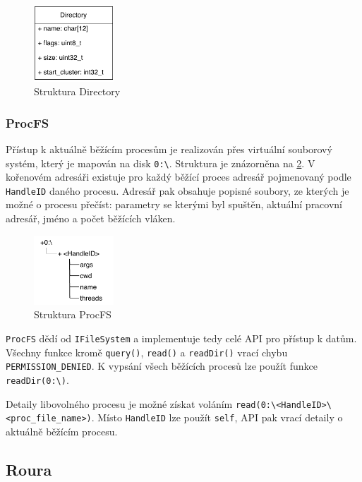 \documentclass[11pt,a4paper]{scrartcl}
\begin{document}
	\begin{figure}[H]
		\centering
		\includegraphics[width=3cm]{dir-c.pdf}
		\caption{Struktura Directory}
		\label{fig:dir-c}
	\end{figure}


	\subsubsection{ProcFS}
	\label{sec:proc-fs}
	Přístup k aktuálně běžícím procesům je realizován přes virtuální souborový systém, který je mapován na disk \verb|0:\|. Struktura je znázorněna na \ref{fig:procfs-struct}. V kořenovém adresáři existuje pro každý běžící proces adresář pojmenovaný podle \verb|HandleID| daného procesu. Adresář pak obsahuje popisné soubory, ze kterých je možné o procesu přečíst: parametry se kterými byl spuštěn, aktuální pracovní adresář, jméno a počet běžících vláken.
	
	\begin{figure}[H]
		\centering
		\includegraphics[width=3cm]{procfs-struct.pdf}
		\caption{Struktura ProcFS}
		\label{fig:procfs-struct}
	\end{figure}
	
	\verb|ProcFS| dědí od \verb|IFileSystem| a implementuje tedy celé API pro přístup k datům. Všechny funkce kromě \verb|query()|, \verb|read()| a \verb|readDir()| vrací chybu \verb|PERMISSION_DENIED|. K vypsání všech běžících procesů lze použít funkce \verb|readDir(0:\)|.
	
	Detaily libovolného procesu je možné získat voláním \verb|read(0:\<HandleID>\<proc_file_name>)|. Místo \verb|HandleID| lze použít \verb|self|, API pak vrací detaily o aktuálně běžícím procesu.

	
	\subsection{Roura}
	
\end{document}
